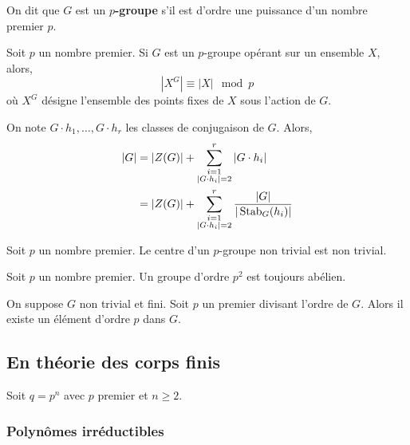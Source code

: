 	
	\begin{definition}
		On dit que $G$ est un \textbf{$p$-groupe} s'il est d'ordre une puissance d'un nombre premier $p$.
	\end{definition}
	
	\begin{proposition}
		Soit $p$ un nombre premier. Si $G$ est un $p$-groupe opérant sur un ensemble $X$, alors,
		\[ |X^G| \equiv |X| \mod p \]
		où $X^G$ désigne l'ensemble des points fixes de $X$ sous l'action de $G$.
	\end{proposition}
	
	\begin{corollary}
		On note $G \cdot h_1, \dots, G \cdot h_r$ les classes de conjugaison de $G$. Alors,
		\begin{align*}
			\vert G \vert &= \vert Z(G) \vert + \sum_{\substack{i=1 \\ \vert G \cdot h_i \vert = 2}}^{r} \vert G \cdot h_i \vert \\
			&= \vert Z(G) \vert + \sum_{\substack{i=1 \\ \vert G \cdot h_i \vert = 2}}^{r} \frac{\vert G \vert}{\vert \operatorname{Stab}_G(h_i) \vert}
		\end{align*}
	\end{corollary}
	
	\begin{corollary}
		Soit $p$ un nombre premier. Le centre d'un $p$-groupe non trivial est non trivial.
	\end{corollary}
	
	\begin{corollary}
		Soit $p$ un nombre premier. Un groupe d'ordre $p^2$ est toujours abélien.
	\end{corollary}
	
	\begin{application}
		On suppose $G$ non trivial et fini. Soit $p$ un premier divisant l'ordre de $G$. Alors il existe un élément d'ordre $p$ dans $G$.
	\end{application}
	
	\subsection{En théorie des corps finis}
	
	Soit $q = p^n$ avec $p$ premier et $n \geq 2$.
	
	\subsubsection{Polynômes irréductibles}
	
